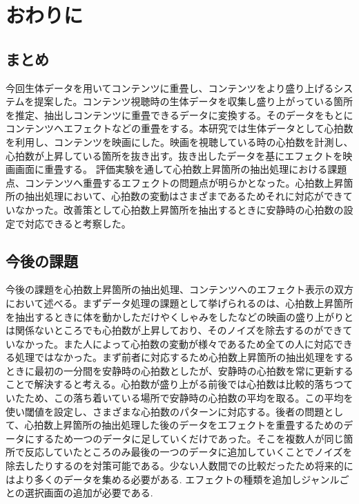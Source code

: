 \chapter{おわりに}

\section{まとめ}
今回生体データを用いてコンテンツに重畳し、コンテンツをより盛り上げるシステムを提案した。コンテンツ視聴時の生体データを収集し盛り上がっている箇所を推定、抽出しコンテンツに重畳できるデータに変換する。そのデータをもとにコンテンツへエフェクトなどの重畳をする。本研究では生体データとして心拍数を利用し、コンテンツを映画にした。映画を視聴している時の心拍数を計測し、心拍数が上昇している箇所を抜き出す。抜き出したデータを基にエフェクトを映画画面に重畳する。
評価実験を通して心拍数上昇箇所の抽出処理における課題点、コンテンツへ重畳するエフェクトの問題点が明らかとなった。心拍数上昇箇所の抽出処理において、心拍数の変動はさまざまであるためそれに対応ができていなかった。改善策として心拍数上昇箇所を抽出するときに安静時の心拍数の設定で対応できると考察した。


\section{今後の課題}
今後の課題を心拍数上昇箇所の抽出処理、コンテンツへのエフェクト表示の双方において述べる。まずデータ処理の課題として挙げられるのは、心拍数上昇箇所を抽出するときに体を動かしただけやくしゃみをしたなどの映画の盛り上がりとは関係ないところでも心拍数が上昇しており、そのノイズを除去するのができていなかった。また人によって心拍数の変動が様々であるため全ての人に対応できる処理ではなかった。まず前者に対応するため心拍数上昇箇所の抽出処理をするときに最初の一分間を安静時の心拍数としたが、安静時の心拍数を常に更新することで解決すると考える。心拍数が盛り上がる前後では心拍数は比較的落ちつていたため、この落ち着いている場所で安静時の心拍数の平均を取る。この平均を使い閾値を設定し、さまざまな心拍数のパターンに対応する。後者の問題として、心拍数上昇箇所の抽出処理した後のデータをエフェクトを重畳するためのデータにするため一つのデータに足していくだけであった。そこを複数人が同じ箇所で反応していたところのみ最後の一つのデータに追加していくことでノイズを除去したりするのを対策可能である。少ない人数間での比較だったため将来的にはより多くのデータを集める必要がある.
エフェクトの種類を追加しジャンルごとの選択画面の追加が必要である. 
